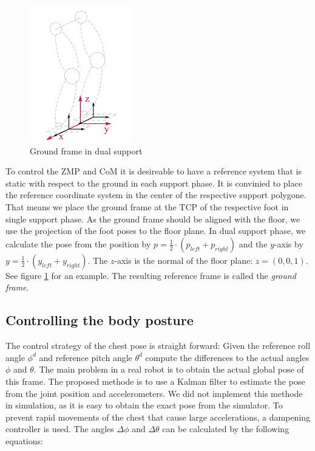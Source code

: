\documentclass[english,ngerman]{KITreprt}
\begin{document}
\begin{figure}
\vspace*{-1em}
\includegraphics[width=0.4\textwidth]{images/ground_frame.png}
\caption{Ground frame in dual support}
\label{img:ground-frame}
\end{figure}

To control the ZMP and CoM it is desireable to have a reference system
that is static with respect to the ground in each support phase. It is
convinied to place the reference coordinate system in the center of the
respective support polygone. That means we place the ground frame at the
TCP of the respective foot in single support phase. As the ground frame
should be aligned with the floor, we use the projection of the foot
poses to the floor plane. In dual support phase, we calculate the pose
from the position by $p = \frac{1}{2} \cdot (p_{left} + p_{right})$ and
the $y$-axis by $y = \frac{1}{2} \cdot (y_{left} + y_{right})$. The
$z$-axis is the normal of the floor plane: $z = (0, 0, 1)$. See figure
\ref{img:ground-frame} for an example. The resulting reference frame is
called the \emph{ground frame}.

\subsection{Controlling the body
posture}\label{controlling-the-body-posture}

The control strategy of the chest pose is straight forward: Given the
reference roll angle $\phi^d$ and reference pitch angle $\theta^d$
compute the differences to the actual angles $\phi$ and $\theta$. The
main problem in a real robot is to obtain the actual global pose of this
frame. The proposed methode is to use a Kalman filter to estimate the
pose from the joint position and accelerometers. We did not implement
this methode in simulation, as it is easy to obtain the exact pose from
the simulator. To prevent rapid movements of the chest that cause large
accelerations, a dampening controller is used. The angles $\Delta \phi$
and $\Delta \theta$ can be calculated by the following equations:
\end{document}
